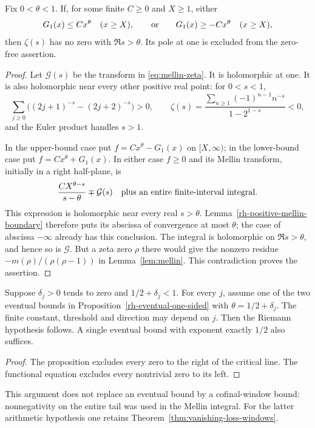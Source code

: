 \begin{proposition}
\label{rh-eventual-one-sided}
Fix $0<\theta<1$. If, for some finite $C\ge0$ and $X\ge1$, either
\[
 G_1(x)\le Cx^\theta\quad(x\ge X),
 \qquad\hbox{or}\qquad
 G_1(x)\ge-Cx^\theta\quad(x\ge X),
\]
then $\zeta(s)$ has no zero with $\Re s>\theta$.
Its pole at one is excluded from the zero-free assertion.
\end{proposition}
\begin{proof}
Let $\mathcal G(s)$ be the transform in
\eqref{eq:mellin-zeta}. It is holomorphic at one. It is also
holomorphic near every other positive real point: for $0<s<1$,
\[
 \sum_{j\ge0}\bigl((2j+1)^{-s}-(2j+2)^{-s}\bigr)>0,
 \qquad
 \zeta(s)=\frac{\sum_{n\ge1}(-1)^{n-1}n^{-s}}{1-2^{1-s}}<0,
\]
and the Euler product handles $s>1$.

In the upper-bound case put $f=Cx^\theta-G_1(x)$ on $[X,\infty)$;
in the lower-bound case put $f=Cx^\theta+G_1(x)$.
In either case $f\ge0$ and its Mellin transform, initially in a
right half-plane, is
\[
 \frac{CX^{\theta-s}}{s-\theta}\mp\mathcal G(s)
 \quad\hbox{plus an entire finite-interval integral}.
\]
This expression is holomorphic near every real $s>\theta$.
Lemma~\ref{rh-positive-mellin-boundary} therefore puts its abscissa
of convergence at most $\theta$; the case of abscissa $-\infty$
already has this conclusion. The integral is holomorphic on
$\Re s>\theta$, and hence so is $\mathcal G$.
But a zeta zero $\rho$ there would give the nonzero residue
$-m(\rho)/(\rho(\rho-1))$ in Lemma~\ref{lem:mellin}.
This contradiction proves the assertion.
\end{proof}

\begin{corollary}\label{rh-eventual-vanishing-loss}
Suppose $\delta_j>0$ tends to zero and $1/2+\delta_j<1$.
For every $j$, assume one of the two eventual bounds in
Proposition~\ref{rh-eventual-one-sided} with
$\theta=1/2+\delta_j$. The finite constant, threshold and direction
may depend on $j$. Then the Riemann hypothesis follows.
A single eventual bound with exponent exactly $1/2$ also suffices.
\end{corollary}
\begin{proof}
The proposition excludes every zero to the right of the critical line.
The functional equation excludes every nontrivial zero to its left.
\end{proof}

This argument does not replace an eventual bound by a cofinal-window
bound: nonnegativity on the entire tail was used in the Mellin integral.
For the latter arithmetic hypothesis one retains
Theorem~\ref{thm:vanishing-loss-windows}.

